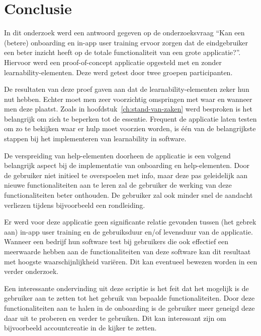 
\chapter{Conclusie}
\label{ch:conclusie}


In dit onderzoek werd een antwoord gegeven op de onderzoeksvraag ``Kan een (betere) onboarding en in-app user training ervoor zorgen dat de eindgebruiker een beter inzicht heeft op de totale functionaliteit van een grote applicatie?''. Hiervoor werd een proof-of-concept applicatie opgesteld met en zonder learnability-elementen. Deze werd getest door twee groepen participanten.

De resultaten van deze proef gaven aan dat de learnability-elementen zeker hun nut hebben. Echter moet men zeer voorzichtig omspringen met waar en wanneer men deze plaatst. Zoals in hoofdstuk~\ref{ch:stand-van-zaken} werd besproken is het belangrijk om zich te beperken tot de essentie. Frequent de applicatie laten testen om zo te bekijken waar er hulp moet voorzien worden, is één van de belangrijkste stappen bij het implementeren van learnability in software.

De verspreiding van help-elementen doorheen de applicatie is een volgend belangrijk aspect bij de implementatie van onboarding en help-elementen. Door de gebruiker niet initieel te overspoelen met info, maar deze pas geleidelijk aan nieuwe functionaliteiten aan te leren zal de gebruiker de werking van deze functionaliteiten beter onthouden. De gebruiker zal ook minder snel de aandacht verliezen tijdens bijvoorbeeld een rondleiding.

Er werd voor deze applicatie geen significante relatie gevonden tussen (het gebrek aan) in-app user training en de gebruiksduur en/of levensduur van de applicatie. Wanneer een bedrijf hun software test bij gebruikers die ook effectief een meerwaarde hebben aan de functionaliteiten van deze software kan dit resultaat met hoogste waarschijnlijkheid variëren. Dit kan eventueel bewezen worden in een verder onderzoek.

Een interessante ondervinding uit deze scriptie is het feit dat het mogelijk is de gebruiker aan te zetten tot het gebruik van bepaalde functionaliteiten. Door deze functionaliteiten aan te halen in de onboarding is de gebruiker meer geneigd deze daar uit te proberen en verder te gebruiken. Dit kan interessant zijn om bijvoorbeeld accountcreatie in de kijker te zetten.
